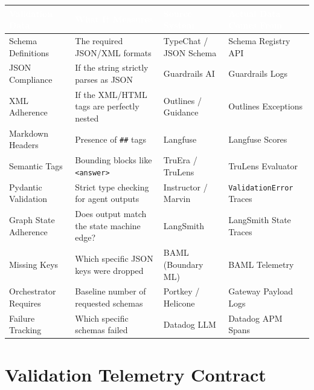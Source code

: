 \documentclass[11pt,a4paper]{article}
\begin{document}
\vspace{0.5cm}
\begin{table}[H]
\centering
\renewcommand{\arraystretch}{1.4}
\begin{tabularx}{\textwidth}{| >{\raggedright\arraybackslash}X >{\raggedright\arraybackslash}X >{\raggedright\arraybackslash}p{3.5cm} >{\raggedright\arraybackslash}X |}
\hline
\rowcolor{dpiblue} \textcolor{white}{\textbf{Validation Data}} & \textcolor{white}{\textbf{What It Measures}} & \textcolor{white}{\textbf{Source System}} & \textcolor{white}{\textbf{Actual Data Comes From}} \\
\hline
Schema Definitions & The required JSON/XML formats & TypeChat / JSON Schema & Schema Registry API \\
JSON Compliance & If the string strictly parses as JSON & Guardrails AI & Guardrails Logs \\
XML Adherence & If the XML/HTML tags are perfectly nested & Outlines / Guidance & Outlines Exceptions \\
Markdown Headers & Presence of \texttt{\#\#} tags & Langfuse & Langfuse Scores \\
Semantic Tags & Bounding blocks like \texttt{<answer>} & TruEra / TruLens & TruLens Evaluator \\
Pydantic Validation & Strict type checking for agent outputs & Instructor / Marvin & \texttt{ValidationError} Traces \\
Graph State Adherence & Does output match the state machine edge? & LangSmith & LangSmith State Traces \\
Missing Keys & Which specific JSON keys were dropped & BAML (Boundary ML) & BAML Telemetry \\
Orchestrator Requires & Baseline number of requested schemas & Portkey / Helicone & Gateway Payload Logs \\
Failure Tracking & Which specific schemas failed & Datadog LLM & Datadog APM Spans \\
\hline
\end{tabularx}
\end{table}
\vspace{0.5cm}

\vspace{1cm}

\section{Validation Telemetry Contract}
\end{document}

